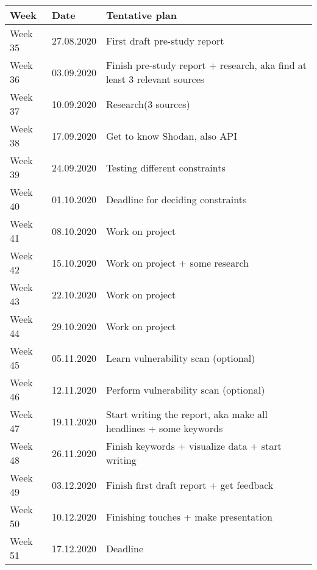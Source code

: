 \begin{tabular}{|l|l|l|}
\hline
Week & Date & Tentative plan                                                                     \\ \hline
Week 35 & 27.08.2020 & First draft pre-study report                                              \\ \hline
Week 36 & 03.09.2020 & Finish pre-study report + research, aka find at least 3 relevant sources \\ \hline
Week 37 & 10.09.2020 & Research(3 sources)                                                       \\ \hline
Week 38 & 17.09.2020 & Get to know Shodan, also API                                              \\ \hline
Week 39 & 24.09.2020 & Testing different constraints                                             \\ \hline
Week 40 & 01.10.2020 & Deadline for deciding constraints                                         \\ \hline
Week 41 & 08.10.2020 & Work on project                                                           \\ \hline
Week 42 & 15.10.2020 & Work on project + some research                                           \\ \hline
Week 43 & 22.10.2020 & Work on project                                                           \\ \hline
Week 44 & 29.10.2020 & Work on project                                                           \\ \hline
Week 45 & 05.11.2020 & Learn vulnerability scan (optional)                                       \\ \hline
Week 46 & 12.11.2020 & Perform vulnerability scan (optional)                                     \\ \hline
Week 47 & 19.11.2020 & Start writing the report, aka make all headlines + some keywords         \\ \hline
Week 48 & 26.11.2020 & Finish keywords + visualize data + start writing                          \\ \hline
Week 49 & 03.12.2020 & Finish first draft report + get feedback                                 \\ \hline
Week 50 & 10.12.2020 & Finishing touches + make presentation                                     \\ \hline
Week 51 & 17.12.2020 & Deadline                                                                  \\ \hline
\end{tabular}

